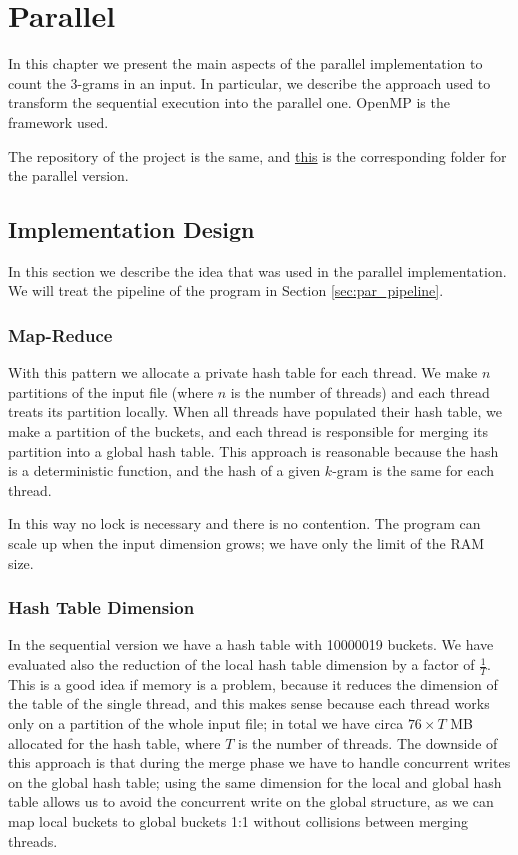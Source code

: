\chapter{Parallel}
\label{cap:parallel}
In this chapter we present the main aspects of the parallel implementation to count the 3-grams in an input. In particular, we describe the approach used to transform the sequential execution into the parallel one. OpenMP is the framework used.

The repository of the project is the same, and \href{https://github.com/edoardosarri24/parallel-trigrams/blob/ef94c1127b974ed4241ad355c5d9b218b3484e1f/parallel}{this} is the corresponding folder for the parallel version.

\section{Implementation Design}
In this section we describe the idea that was used in the parallel implementation. We will treat the pipeline of the program in Section \ref{sec:par_pipeline}.

\subsection{Map-Reduce}
With this pattern we allocate a private hash table for each thread. We make $n$ partitions of the input file (where $n$ is the number of threads) and each thread treats its partition locally. When all threads have populated their hash table, we make a partition of the buckets, and each thread is responsible for merging its partition into a global hash table. This approach is reasonable because the hash is a deterministic function, and the hash of a given $k$-gram is the same for each thread.

In this way no lock is necessary and there is no contention. The program can scale up when the input dimension grows; we have only the limit of the RAM size.

\subsection{Hash Table Dimension}
In the sequential version we have a hash table with 10000019 buckets. We have evaluated also the reduction of the local hash table dimension by a factor of $\tfrac{1}{T}$. This is a good idea if memory is a problem, because it reduces the dimension of the table of the single thread, and this makes sense because each thread works only on a partition of the whole input file; in total we have circa $76 \times T$ MB allocated for the hash table, where $T$ is the number of threads. The downside of this approach is that during the merge phase we have to handle concurrent writes on the global hash table; using the same dimension for the local and global hash table allows us to avoid the concurrent write on the global structure, as we can map local buckets to global buckets 1:1 without collisions between merging threads.

